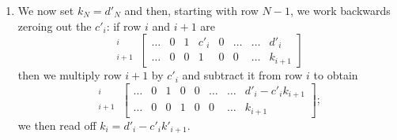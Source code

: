 \begin{sidebar}
\begin{enumerate}
\[\begin{array}{ccccccccccc}
	1 & c'_{0} \\
	 & 1 & c'_{1} \\
	&  & 1 & c'_{2}\\
	& &  & \ddots & \ddots \\
	& & &  & 1 & c'_{i} \\
	& & & &  & \ddots & \ddots \\
	& & & & &  & 1 & c'_{N-1} \\
	& & & & & &  & 1 
\end{array}\right]
\left[\begin{array}{c}
	k_{0}\\
	k_{1}\\
	k_{2}\\
	\vdots\\
	k_{i}\\
	\vdots\\
	k_{N-1}\\
	k_{N}
\end{array}\right] = 
\left[\begin{array}{c}
	d'_{0}\\
	d'_{1}\\
	d'_{2}\\
	\vdots\\
	d'_{i}\\
	\vdots\\
	d'_{N-1}\\
	d'_{N}
\end{array}\right].
\]

\item We now set $k_{N}=d'_{N}$ and then, starting with row $N-1$, we work backwards zeroing out the $c'_{i}$: if row $i$ and $i+1$ are%
\[
\begin{array}{r} {}^{i}\\ {}^{i+1}\end{array}\,
\left[\begin{array}{ccccccc|c}
	 \ldots & 0 & 1 & c'_{i} & 0 & \ldots & \ldots & d'_{i}\\
	 \ldots & 0 & 0 & 1      & 0 & 0      & \ldots & k_{i+1}
\end{array}\right]
\]
then we multiply row $i+1$ by $c'_{i}$ and subtract it from row $i$ to obtain
\[
\begin{array}{r} {}^{i}\\ {}^{i+1}\end{array}\,
\left[\begin{array}{ccccccc|c}
	 \ldots & 0 & 1 & 0 & 0 & \ldots & \ldots & d'_{i}-c'_{i}k_{i+1}\\
	 \ldots & 0 & 0 & 1 & 0 & 0      & \ldots & k_{i+1}
\end{array}\right];
\]
we then read off $k_{i} = d'_{i}-c'_{i}k'_{i+1}$.
\end{enumerate}
\end{sidebar}
